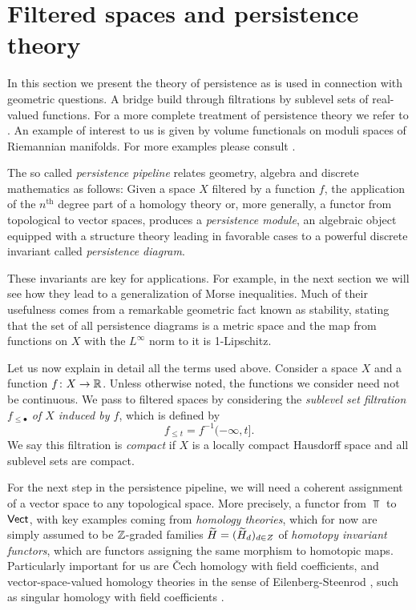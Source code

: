 
\section{Filtered spaces and persistence theory} \label{s:persistence}

In this section we present the theory of persistence as is used in connection with geometric questions.
A bridge build through filtrations by sublevel sets of real-valued functions.
For a more complete treatment of persistence theory we refer to \cite{Chazal.2016a, MR3408277}.
An example of interest to us is given by volume functionals on moduli spaces of Riemannian manifolds.
For more examples please consult \cite{polterovich2020topological}.

The so called \textit{persistence pipeline} relates geometry, algebra and discrete mathematics as follows:
Given a space $X$ filtered by a function $f$, the application of the $n^{\mathrm{th}}$ degree part of a homology theory or, more generally, a functor from topological to vector spaces, produces a \textit{persistence module}, an algebraic object equipped with a structure theory leading in favorable cases to a powerful discrete invariant called \textit{persistence diagram}.

These invariants are key for applications.
For example, in the next section we will see how they lead to a generalization of Morse inequalities.
Much of their usefulness comes from a remarkable geometric fact known as stability, stating that the set of all persistence diagrams is a metric space and the map from functions on $X$ with the $L^\infty$ norm to it is 1-Lipschitz.

Let us now explain in detail all the terms used above.
Consider a space $X$ and a function $f \colon X \to \mathbb{R}$.
Unless otherwise noted, the functions we consider need not be continuous.
We pass to filtered spaces by considering the \textit{sublevel set filtration $f_{\leq \bullet}$ of $X$ induced by $f$}, which is defined by
\begin{equation*}
f_{\leq t} = f^{-1}(-\infty, t].
\end{equation*}
We say this filtration is \textit{compact} if $X$ is a locally compact Hausdorff space and all sublevel sets are compact.

For the next step in the persistence pipeline, we will need a coherent assignment of a vector space to any topological space.
More precisely, a functor from $\Top$ to $\mathsf{Vect}$, with key examples coming from \emph{homology theories}, which for now are simply assumed to be $\mathbb{Z}$-graded families $\widetilde{H} = (\widetilde{H}_d)_{d \in Z}$ of \emph{homotopy invariant functors}, which are functors assigning the same morphism to homotopic maps.
Particularly important for us are \v{C}ech homology \cite[Section IX-X]{MR0050886} with field coefficients, and vector-space-valued homology theories in the sense of Eilenberg-Steenrod \cite[Section I]{MR0050886}, such as singular homology with field coefficients \cite{Eilenberg.1944}.

